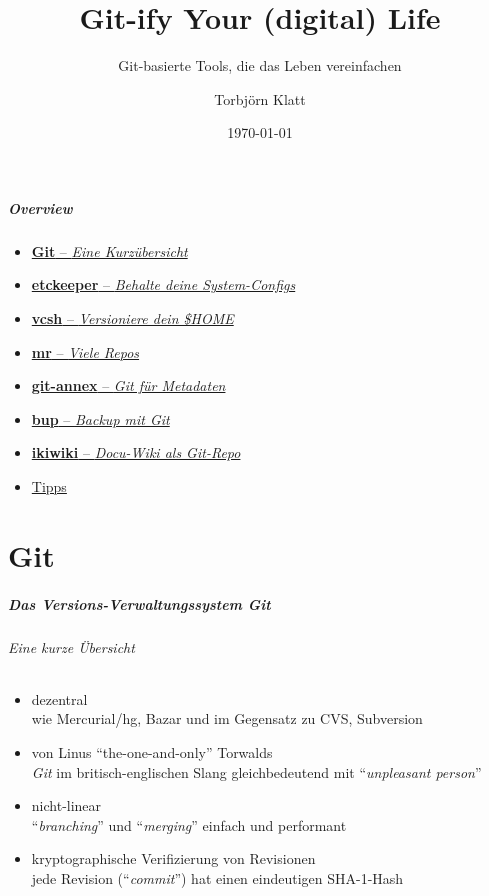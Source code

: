 \documentclass[ngerman,hyperref={pdfpagelabels=false}]{beamer}
\title{Git-ify Your (digital) Life}
\subtitle{Git-basierte Tools, die das Leben vereinfachen}
\author{Torbjörn Klatt}
\institute{JSC}
\date{\today}
\begin{document}
\maketitle

\begin{frame}
  \frametitle{Overview}
  \begin{itemize}
    \item \hyperlink{git}{\textbf{Git} -- \textit{Eine Kurzübersicht}}
    \item \hyperlink{etckeeper}{\textbf{etckeeper} -- \textit{Behalte deine System-Configs}}
    \item \hyperlink{vcsh}{\textbf{vcsh} -- \textit{Versioniere dein \$HOME}}
    \item \hyperlink{mr}{\textbf{mr} -- \textit{Viele Repos}}
    \item \hyperlink{gitannex}{\textbf{git-annex} -- \textit{Git für Metadaten}}
    \item \hyperlink{bup}{\textbf{bup} -- \textit{Backup mit Git}}
    \item \hyperlink{ikiwiki}{\textbf{ikiwiki} -- \textit{Docu-Wiki als Git-Repo}}
    \item \hyperlink{tipps}{Tipps}
  \end{itemize}
\end{frame}


\part{Git}
\makepart

\begin{frame}[label=git]
  \frametitle{Das Versions-Verwaltungssystem \textit{Git}}
  \framesubtitle{Eine kurze Übersicht}
  \begin{itemize}
    \item dezentral\\
      {\scriptsize wie Mercurial/hg, Bazar und im Gegensatz zu CVS, Subversion}
    \item von Linus ``the-one-and-only'' Torwalds\\
      {\scriptsize\textit{Git} im britisch-englischen Slang gleichbedeutend mit ``\textit{unpleasant person}''}
    \item nicht-linear\\
      {\scriptsize ``\textit{branching}'' und ``\textit{merging}'' einfach und performant}
    \item kryptographische Verifizierung von Revisionen\\
      {\scriptsize jede Revision (``\textit{commit}'') hat einen eindeutigen SHA-1-Hash}
  \end{itemize}
\end{frame}
\end{document}
